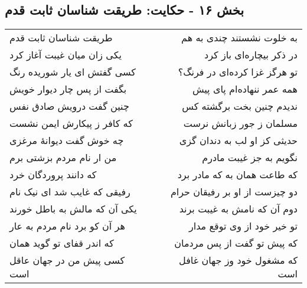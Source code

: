 \begin{center}
\section*{بخش ۱۶ - حکایت: طریقت شناسان ثابت قدم}
\label{sec:016}
\begin{longtable}{l p{0.5cm} r}
طریقت شناسان ثابت قدم
&&
به خلوت نشستند چندی به هم
\\
یکی زان میان غیبت آغاز کرد
&&
در ذکر بیچاره‌ای باز کرد
\\
کسی گفتش ای یار شوریده رنگ
&&
تو هرگز غزا کرده‌ای در فرنگ؟
\\
بگفت از پس چار دیوار خویش
&&
همه عمر ننهاده‌ام پای پیش
\\
چنین گفت درویش صادق نفس
&&
ندیدم چنین بخت برگشته کس
\\
که کافر ز پیکارش ایمن نشست
&&
مسلمان ز جور زبانش نرست
\\
چه خوش گفت دیوانهٔ مرغزی
&&
حدیثی کز او لب به دندان گزی
\\
من ار نام مردم بزشتی برم
&&
نگویم به جز غیبت مادرم
\\
که دانند پروردگان خرد
&&
که طاعت همان به که مادر برد
\\
رفیقی که غایب شد ای نیک نام
&&
دو چیزست از او بر رفیقان حرام
\\
یکی آن که مالش به باطل خورند
&&
دوم آن که نامش به غیبت برند
\\
هر آن کو برد نام مردم به عار
&&
تو خیر خود از وی توقع مدار
\\
که اندر قفای تو گوید همان
&&
که پیش تو گفت از پس مردمان
\\
کسی پیش من در جهان عاقل است
&&
که مشغول خود وز جهان غافل است
\\
\end{longtable}
\end{center}

